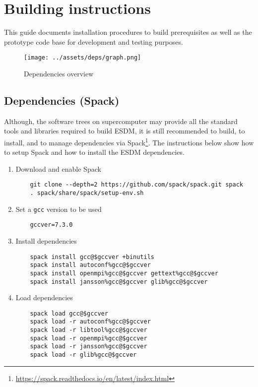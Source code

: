 \section{Building instructions}%
\label{installation-instructions-for-mistral}
This guide documents installation procedures to build prerequisites as well as the prototype code base for development and testing purposes.

\begin{figure}[!ht]
  \begin{center}
    \texttt{[image: ../assets/deps/graph.png]}
  \end{center}
  \caption{Dependencies overview}
  \label{fig:deps}
\end{figure}

\subsection{Dependencies (Spack)}%
\label{satisfying-requirements}
Although, the software trees on supercomputer may provide all the standard tools and libraries required to build ESDM, it is still recommended to build, to install, and to manage dependencies via Spack\footnote{\url{https://spack.readthedocs.io/en/latest/index.html}}.
The instructions below show how to setup Spack and how to install the ESDM dependencies.

\begin{enumerate}
  \item Download and enable Spack
    \begin{lstlisting}
    git clone --depth=2 https://github.com/spack/spack.git spack
    . spack/share/spack/setup-env.sh
    \end{lstlisting}
  \item Set a \lstinline|gcc| version to be used
    \begin{lstlisting}
    gccver=7.3.0
    \end{lstlisting}
  \item Install dependencies
    \begin{lstlisting}
    spack install gcc@$gccver +binutils
    spack install autoconf%gcc@$gccver
    spack install openmpi%gcc@$gccver gettext%gcc@$gccver
    spack install jansson%gcc@$gccver glib%gcc@$gccver
    \end{lstlisting}
  \item Load dependencies
    \begin{lstlisting}
    spack load gcc@$gccver
    spack load -r autoconf%gcc@$gccver
    spack load -r libtool%gcc@$gccver
    spack load -r openmpi%gcc@$gccver
    spack load -r jansson%gcc@$gccver
    spack load -r glib%gcc@$gccver
    \end{lstlisting}
\end{enumerate}


